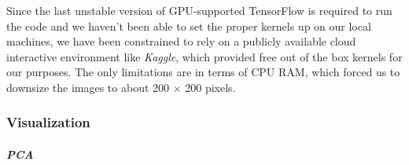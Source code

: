 \documentclass[]{article}
\let\oldparagraph\paragraph
\renewcommand{\paragraph}[1]{\oldparagraph{#1}\mbox{}}
\begin{document}
Since the last unstable version of GPU-supported TensorFlow is required
to run the code and we haven't been able to set the proper kernels up on
our local machines, we have been constrained to rely on a publicly
available cloud interactive environment like \emph{Kaggle}, which
provided free out of the box kernels for our purposes. The only
limitations are in terms of CPU RAM, which forced us to downsize the
images to about 200 \(\times\) 200 pixels.

\hypertarget{visualization}{%
\subsubsection{Visualization}\label{visualization}}

\hypertarget{pca}{%
\paragraph{\texorpdfstring{\emph{PCA}}{PCA}}\label{pca}}
\end{document}
